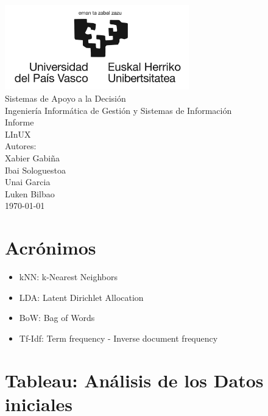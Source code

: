 \documentclass{report}
\begin{document}
    \begin{titlepage}
        \centering
        \includegraphics[width=0.6\textwidth]{./img/logo.jpg}\\
        \vspace{1cm}
        \LARGE Sistemas de Apoyo a la Decisión\\
        \vspace{0.5cm}
        \Large Ingeniería Informática de Gestión y Sistemas de Información\\
        \vspace{3cm}
        \Huge Informe\\
        \huge LInUX\\
        \vspace{2.5cm}
        \Large Autores:\\
        \vspace{0.2cm}
        \large Xabier Gabiña\\
        \large Ibai Sologuestoa\\
        \large Unai Garcia\\
        \large Luken Bilbao\\
        \vfill
        \today
    \end{titlepage}
    \tableofcontents
    \listoffigures
    \listoftables
    \chapter*{Acrónimos}
        \begin{itemize}
            \item kNN: k-Nearest Neighbors
            \item LDA: Latent Dirichlet Allocation
            \item BoW: Bag of Words
            \item Tf-Idf: Term frequency - Inverse document frequency
        \end{itemize}
    \chapter{Tableau: Análisis de los Datos iniciales}
\end{document}
